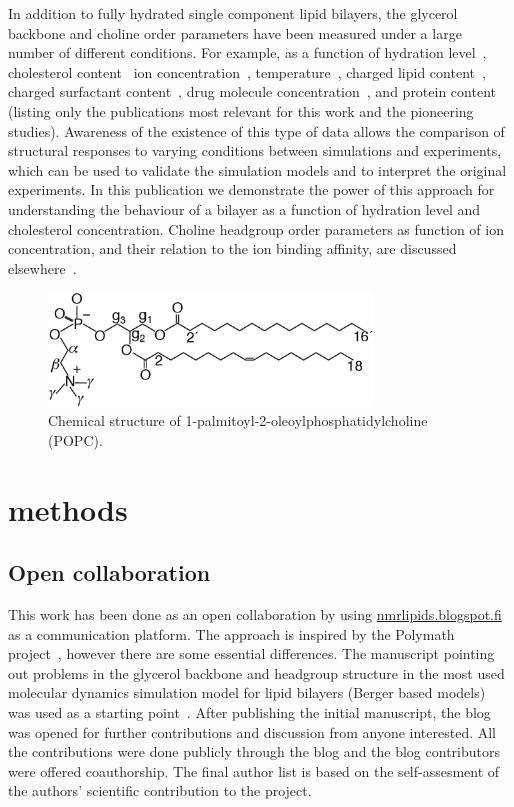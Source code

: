 \documentclass[pre,aps,floatfix,authordate1-4,twocolumn]{revtex4-1}
\begin{document}
In addition to fully hydrated single component lipid bilayers, the glycerol backbone and choline order parameters
have been measured under a large number of different conditions. For example, as a function of hydration level~\cite{bechinger91,ulrich94,dvinskikh05b}, cholesterol content~\cite{brown78,ferreira13}
ion concentration~\cite{brown77,akutsu81,altenbach84,roux90,roux91}, temperature~\cite{gally75}, charged lipid content~\cite{roux90,roux91}, charged surfactant content~\cite{scherer89}, 
drug molecule concentration~\cite{browning82,kelusky84,castro08}, and protein content~\cite{roux89,kuchinka89} (listing only the publications most relevant for this work and the pioneering studies).
Awareness of the existence of this type of data allows the comparison of structural responses to varying conditions between simulations and experiments,
which can be used to validate the simulation models and to interpret the original experiments. 
In this publication we demonstrate the power of this approach for understanding the behaviour of a bilayer as a function of hydration level and cholesterol concentration.
Choline headgroup order parameters as function of ion concentration, and their relation to the ion binding affinity, are discussed elsewhere~\cite{ionpaper}.

  \begin{figure}[]
  \centering
  \includegraphics[width=8.6cm]{POPCstructure.eps}

  \caption{\label{POPCstructure}
    Chemical structure of  1-palmitoyl-2-oleoylphosphatidylcholine (POPC).}
  
\end{figure}

\section{methods}

\subsection{Open collaboration}

This work has been done as an open collaboration by using \url{nmrlipids.blogspot.fi} as a communication platform.
The approach is inspired by the Polymath project~\cite{gowers09}, however there are some essential differences. 
The manuscript pointing out problems in the glycerol backbone and
headgroup structure in the most used molecular dynamics simulation model for lipid bilayers (Berger based models) was used as a starting point~\cite{ollila13}.
After publishing the initial manuscript, the blog was opened for further contributions and discussion from anyone interested. 
All the contributions were done publicly through the blog and the blog contributors were offered coauthorship. The final author list
is based on the self-assesment of the authors' scientific contribution to the project.
\end{document}
